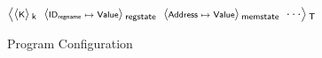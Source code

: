 \begin{figure}[t]
  \centering
  \renewcommand{\dotCt}[1]{\scriptstyle\s{#1}}
  \newcommand{\regstate}{\scriptstyle\s{ID}_\s{regname} \;\mapsto\; \s{Value}}
  \newcommand{\argc}{\scriptstyle\s{Int}}
  \newcommand{\argv}{\scriptstyle\s{Address}} 
  \newcommand{\entrypoint}{\scriptstyle\s{Address}}
  \newcommand{\codemem}{\scriptstyle\textit{Address} \;\mapsto\; \textit{Instruction}}
  \newcommand{\datamem}{\scriptstyle\s{Address} \;\mapsto\; \s{Value}}
  \newcommand{\bssmem}{\scriptstyle\textit{Address} \;\mapsto\; \textit{Value}}
  \newcommand{\stackmem}{\scriptstyle\textit{Address} \;\mapsto\; \textit{Value}}
  \newcommand{\heapmem}{\scriptstyle\textit{Address} \;\mapsto\; \textit{Value}}
$
\kall{T}{
  \begin{array}{@{}c@{}}
  \kall{k}{\dotCt{K}} \mathrel{}
  \mathrel{}
  \kall{regstate}{\regstate} \mathrel{}
  \mathrel{}
  \kall{memstate} {\datamem} \mathrel{}
  \mathrel{}
  \cdots
  \cmt{ 
  \kall{executionEnv}{ 
  \kall{commandineArgs}{
    \kall{argc}{\argc} \mathrel{}    
    \kall{argv}{\argv} \mathrel{}
  } \mathrel{}
  \kall{entryPoint}{\entrypoint} \mathrel{}
}}
  \end{array}
}
$
  \caption{Program Configuration}
  \label{fig:config}
\end{figure}
